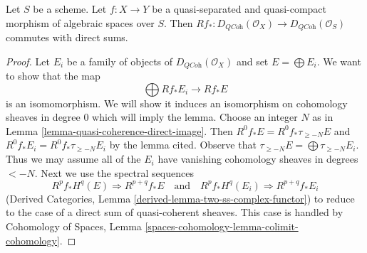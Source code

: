 \begin{lemma}
\label{lemma-quasi-coherence-pushforward-direct-sums}
Let $S$ be a scheme. Let $f : X \to Y$ be a quasi-separated and
quasi-compact morphism of algebraic spaces over $S$. Then
$Rf_* : D_{\textit{QCoh}}(\mathcal{O}_X) \to D_{\textit{QCoh}}(\mathcal{O}_S)$
commutes with direct sums.
\end{lemma}

\begin{proof}
Let $E_i$ be a family of objects of $D_{\textit{QCoh}}(\mathcal{O}_X)$
and set $E = \bigoplus E_i$. We want to show that the map
$$
\bigoplus Rf_*E_i \longrightarrow Rf_*E
$$
is an isomomorphism. We will show it induces an isomorphism on
cohomology sheaves in degree $0$ which will imply the lemma.
Choose an integer $N$ as in Lemma \ref{lemma-quasi-coherence-direct-image}.
Then $R^0f_*E = R^0f_*\tau_{\geq -N}E$ and
$R^0f_*E_i = R^0f_*\tau_{\geq -N}E_i$ by the lemma cited. Observe that
$\tau_{\geq -N}E = \bigoplus \tau_{\geq -N}E_i$.
Thus we may assume all of the $E_i$ have vanishing cohomology
sheaves in degrees $< -N$. Next we use the spectral sequences
$$
R^pf_*H^q(E) \Rightarrow R^{p + q}f_*E
\quad\text{and}\quad
R^pf_*H^q(E_i) \Rightarrow R^{p + q}f_*E_i
$$
(Derived Categories, Lemma \ref{derived-lemma-two-ss-complex-functor})
to reduce to the case of a direct sum of quasi-coherent sheaves.
This case is handled by
Cohomology of Spaces, Lemma \ref{spaces-cohomology-lemma-colimit-cohomology}.
\end{proof}

